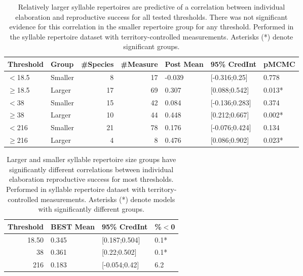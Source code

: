 \documentclass{article}
\begin{document}
  
  \begin{table}[H]
  \centering
  \caption{ Relatively larger syllable repertoires are predictive of a correlation between individual elaboration and reproductive success for all tested thresholds. There was not significant evidence for this correlation in the smaller repertoire group for any threshold. Performed in the syllable repertoire dataset with territory-controlled measurements. Asterisks (*) denote significant groups.} 
  \begin{tabular}{llrrlll}
  \hline
  Threshold & Group & \#Species & \#Measure & Post Mean & 95\% CredInt & pMCMC \\ 
  \hline
  $<$18.5 & Smaller & 8 & 17 & -0.039 & [-0.316;0.25] & 0.778 \\ 
  $\ge$18.5 & Larger & 17 & 69 & 0.307 & [0.088;0.542] & 0.013* \\ 
  $<$38 & Smaller & 15 & 42 & 0.084 & [-0.136;0.283] & 0.374 \\ 
  $\ge$38 & Larger & 10 & 44 & 0.448 & [0.212;0.667] & 0.002* \\ 
  $<$216 & Smaller & 21 & 78 & 0.176 & [-0.076;0.424] & 0.134 \\ 
  $\ge$216 & Larger & 4 & 8 & 0.476 & [0.086;0.902] & 0.023* \\ 
  \hline
  \end{tabular}
  \end{table}
  \begin{table}[H]
  \centering
  \caption{Larger and smaller syllable repertoire size groups have significantly different correlations between individual elaboration reproductive success for most thresholds. Performed in syllable repertoire dataset with territory-controlled measurements. Asterisks (*) denote models with significantly different groups.} 
  \begin{tabular}{rlll}
  \hline
  Threshold & BEST Mean & 95\% CredInt & \%$<$0 \\ 
  \hline
  18.50 & 0.345 & [0.187;0.504] & 0.1* \\ 
  38 & 0.361 & [0.22;0.502] & 0.1* \\ 
  216 & 0.183 & [-0.054;0.42] & 6.2 \\ 
  \hline
  \end{tabular}
  \end{table}
  
  
  
\end{document}
